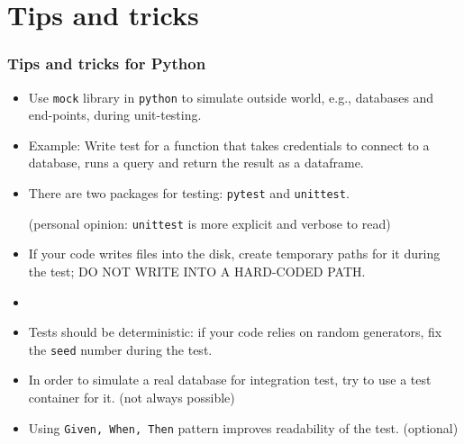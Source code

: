 \documentclass[9pt,xcolor=dvipsnames]{beamer}
\begin{document}
\section{Tips and tricks}
\begin{frame}
  \frametitle{Tips and tricks for Python}
  \begin{overlayarea}{\textwidth}{\textheight}
  \begin{itemize}
    \item Use {\color{red}\tt mock} library in {\tt python} to simulate
      outside world, e.g., databases and end-points, during
      {\color{red}unit-testing}.
    \item<only@2>[] Example: Write test for a function that takes
      credentials to connect to a database, runs a query and return the
      result as a dataframe.
      
      \item<3-> There are two packages for testing: {\tt pytest} and
        {\tt unittest}.

        (personal opinion: {\tt unittest} is more
        explicit and verbose to read)
          \item<4-> If your code writes files into the disk,
            create temporary paths for it during the test; DO NOT
            WRITE INTO A HARD-CODED PATH.
          \item<only@4>[] 
        \item<5-> Tests should be deterministic: if your code relies
          on random generators, fix the {\tt \color{red}seed} number during the test.
        \item<6-> In order to simulate a real database for integration
          test, try to use {\color{red}a test container} for it. (not
          always possible)
          \item<7-> Using {\tt Given, When, Then} pattern improves
            readability of the test. (optional)
  \end{itemize}
  \end{overlayarea}
\end{frame}
\end{document}
